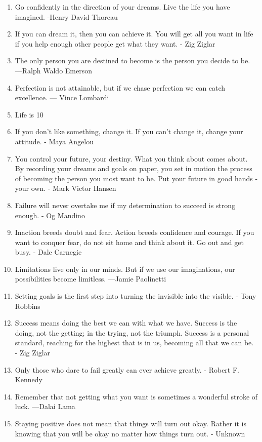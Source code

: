 \begin{enumerate}
            \item Go confidently in the direction of your dreams. Live the life you have imagined. -Henry David Thoreau
            \item If you can dream it, then you can achieve it. You will get all you want in life if you help enough other people get what they want. - Zig Ziglar
            \item The only person you are destined to become is the person you decide to be. —Ralph Waldo Emerson
            \item Perfection is not attainable, but if we chase perfection we can catch excellence. — Vince Lombardi
            \item Life is 10%
            \item If you don’t like something, change it. If you can’t change it, change your attitude. - Maya Angelou
            \item You control your future, your destiny. What you think about comes about. By recording your dreams and goals on paper, you set in motion the process of becoming the person you most want to be. Put your future in good hands - your own. - Mark Victor Hansen
            \item Failure will never overtake me if my determination to succeed is strong enough. - Og Mandino
            \item Inaction breeds doubt and fear. Action breeds confidence and courage. If you want to conquer fear, do not sit home and think about it. Go out and get busy. - Dale Carnegie
            \item Limitations live only in our minds. But if we use our imaginations, our possibilities become limitless. —Jamie Paolinetti
            \item Setting goals is the first step into turning the invisible into the visible. - Tony Robbins
            \item Success means doing the best we can with what we have. Success is the doing, not the getting; in the trying, not the triumph. Success is a personal standard, reaching for the highest that is in us, becoming all that we can be. - Zig Ziglar
            \item Only those who dare to fail greatly can ever achieve greatly. - Robert F. Kennedy
            \item Remember that not getting what you want is sometimes a wonderful stroke of luck. —Dalai Lama
            \item Staying positive does not mean that things will turn out okay. Rather it is knowing that you will be okay no matter how things turn out. - Unknown

\end{enumerate}
